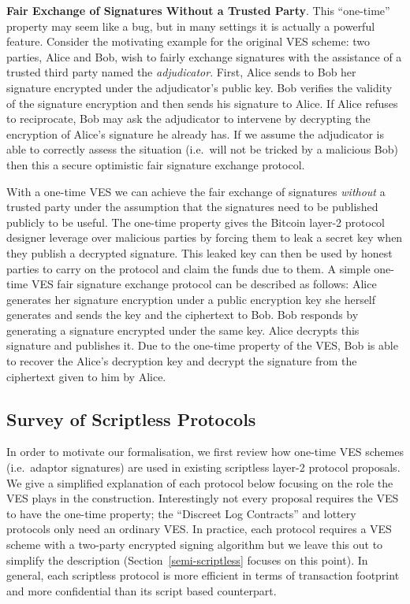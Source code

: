 \textbf{Fair Exchange of Signatures Without a Trusted Party}. This ``one-time'' property may seem like a bug, but in many settings it is actually a powerful feature. Consider the motivating example for the original VES scheme\cite{Boneh:2003:AVE:1766171.1766207}: two parties, Alice and Bob, wish to fairly exchange signatures with the assistance of a trusted third party named the \emph{adjudicator}. First, Alice sends to Bob her signature encrypted under the adjudicator's public key. Bob verifies the validity of the signature encryption and then sends his signature to Alice. If Alice refuses to reciprocate, Bob may ask the adjudicator to intervene by decrypting the encryption of Alice's signature he already has. If we assume the adjudicator is able to correctly assess the situation (i.e.\ will not be tricked by a malicious Bob) then this a secure optimistic fair signature exchange protocol.

With a one-time VES we can achieve the fair exchange of signatures \emph{without} a trusted party under the assumption that the signatures need to be published publicly to be useful. The one-time property gives the Bitcoin layer-2 protocol designer leverage over malicious parties by forcing them to leak a secret key when they publish a decrypted signature. This leaked key can then be used by honest parties to carry on the protocol and claim the funds due to them. A simple one-time VES fair signature exchange protocol can be described as follows: Alice generates her signature encryption under a public encryption key she herself generates and sends the key and the ciphertext to Bob. Bob responds by generating a signature encrypted under the same key. Alice decrypts this signature and publishes it. Due to the one-time property of the VES, Bob is able to recover the Alice's decryption key and decrypt the signature from the ciphertext given to him by Alice.


\subsection{Survey of Scriptless Protocols}
\label{exisitng-protocols}

In order to motivate our formalisation, we first review how one-time VES schemes (i.e.\ adaptor signatures) are used in existing scriptless layer-2 protocol proposals. We give a simplified explanation of each protocol below focusing on the role the VES plays in the construction. Interestingly not every proposal requires the VES to have the one-time property; the ``Discreet Log Contracts'' and lottery protocols only need an ordinary VES\@. In practice, each protocol requires a VES scheme with a two-party encrypted signing algorithm but we leave this out to simplify the description (Section~\ref{semi-scriptless} focuses on this point). In general, each scriptless protocol is more efficient in terms of transaction footprint and more confidential than its script based counterpart.

